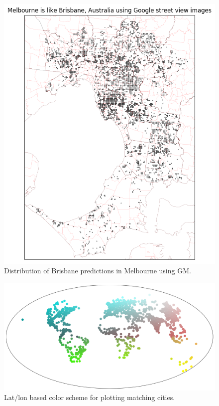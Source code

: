 \documentclass[final,3p,times,authoryear]{elsarticle}
\begin{document}
\begin{figure}[!htbp]
\centering    
\includegraphics[scale=0.25]{Images/Melbourne_Brisbane,Australia-GM.png} 
\caption{Distribution of Brisbane predictions in Melbourne using GM.}    
 \label{fig:gm_mel_bris}  
\end{figure} 


\begin{figure}[!htbp]
\centering    
\includegraphics[scale=0.25]{Images/World_map_color_scheme.png} 
\caption{Lat/lon based color scheme for plotting matching cities.}    
 \label{fig:colorscheme}  
\end{figure} 
\end{document}
